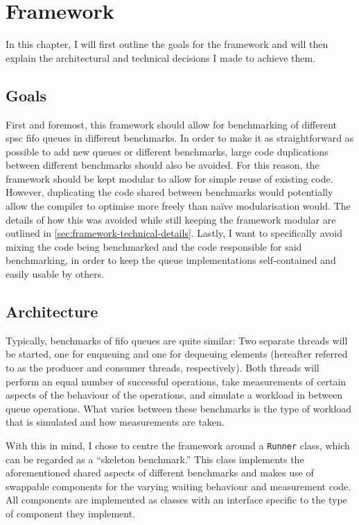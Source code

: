 \chapter{Framework}
\label{ch:framework}
In this chapter, I will first outline the goals for the framework and will then explain the
architectural and technical decisions I made to achieve them.

\section{Goals}
First and foremost, this framework should allow for benchmarking of different \acrshort{spsc} \acrshort{fifo}
queues in different benchmarks.
In order to make it as straightforward as possible to add new queues or different benchmarks, large code
duplications between different benchmarks should also be avoided.
For this reason, the framework should be kept modular to allow for simple reuse of existing code.
However, duplicating the code shared between benchmarks would potentially allow the compiler to optimise more
freely than na\"ive modularisation would. The details of how this was avoided while still keeping the
framework modular are outlined in \autoref{sec:framework-technical-details}.
Lastly, I want to specifically avoid mixing the code being benchmarked and the code responsible for said
benchmarking, in order to keep the queue implementations self-contained and easily usable by others.

\section{Architecture}
Typically, benchmarks of \acrshort{fifo} queues are quite similar\cite{EQueue,B-Queue,MCRingBuffer}:
Two separate threads will be started, one for enqueuing and one for dequeuing elements
(hereafter referred to as the producer and consumer threads, respectively).
Both threads will perform an equal number of successful operations, take measurements of certain
aspects of the behaviour of the operations, and simulate a workload in between queue operations.
What varies between these benchmarks is the type of workload that is simulated and how measurements are taken.

With this in mind, I chose to centre the framework around a \texttt{Runner} class, which can be regarded as a
``skeleton benchmark.''
This class implements the aforementioned shared aspects of different benchmarks and makes use of swappable
components for the varying waiting behaviour and measurement code.
All components are implemented as classes with an interface specific to the type of component they implement.

